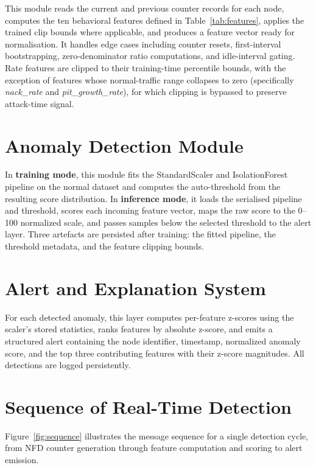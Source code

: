 \documentclass[12pt]{report}
\begin{document}
This module reads the current and previous counter records for each node, computes the ten behavioral features defined in Table~\ref{tab:features}, applies the trained clip bounds where applicable, and produces a feature vector ready for normalisation. It handles edge cases including counter resets, first-interval bootstrapping, zero-denominator ratio computations, and idle-interval gating. Rate features are clipped to their training-time percentile bounds, with the exception of features whose normal-traffic range collapses to zero (specifically \textit{nack\_rate} and \textit{pit\_growth\_rate}), for which clipping is bypassed to preserve attack-time signal.

\section{Anomaly Detection Module}

In \textbf{training mode}, this module fits the StandardScaler and IsolationForest pipeline on the normal dataset and computes the auto-threshold from the resulting score distribution. In \textbf{inference mode}, it loads the serialised pipeline and threshold, scores each incoming feature vector, maps the raw score to the 0--100 normalized scale, and passes samples below the selected threshold to the alert layer. Three artefacts are persisted after training: the fitted pipeline, the threshold metadata, and the feature clipping bounds.

\section{Alert and Explanation System}

For each detected anomaly, this layer computes per-feature z-scores using the scaler's stored statistics, ranks features by absolute z-score, and emits a structured alert containing the node identifier, timestamp, normalized anomaly score, and the top three contributing features with their z-score magnitudes. All detections are logged persistently.

\section{Sequence of Real-Time Detection}

Figure~\ref{fig:sequence} illustrates the message sequence for a single detection cycle, from NFD counter generation through feature computation and scoring to alert emission.
\end{document}
